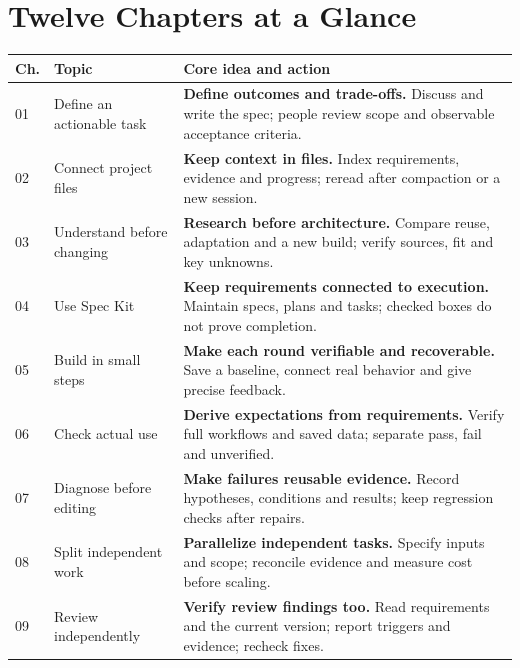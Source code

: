 \clearpage\section*{Twelve Chapters at a Glance}\label{summary}
\vspace{3mm}
\begingroup
\renewcommand{\arraystretch}{1.12}
\begin{tabularx}{\linewidth}{@{}L{8mm}L{43mm}Y@{}}
\toprule Ch. & Topic & Core idea and action\\\midrule
\textcolor{accent}{\textsf{01}} & Define an actionable task & \textbf{Define outcomes and trade-offs.} Discuss and write the spec; people review scope and observable acceptance criteria.\\[5pt]
\textcolor{accent}{\textsf{02}} & Connect project files & \textbf{Keep context in files.} Index requirements, evidence and progress; reread after compaction or a new session.\\[5pt]
\textcolor{accent}{\textsf{03}} & Understand before changing & \textbf{Research before architecture.} Compare reuse, adaptation and a new build; verify sources, fit and key unknowns.\\[5pt]
\textcolor{accent}{\textsf{04}} & Use Spec Kit & \textbf{Keep requirements connected to execution.} Maintain specs, plans and tasks; checked boxes do not prove completion.\\[5pt]
\textcolor{accent}{\textsf{05}} & Build in small steps & \textbf{Make each round verifiable and recoverable.} Save a baseline, connect real behavior and give precise feedback.\\[5pt]
\textcolor{accent}{\textsf{06}} & Check actual use & \textbf{Derive expectations from requirements.} Verify full workflows and saved data; separate pass, fail and unverified.\\[5pt]
\textcolor{accent}{\textsf{07}} & Diagnose before editing & \textbf{Make failures reusable evidence.} Record hypotheses, conditions and results; keep regression checks after repairs.\\[5pt]
\textcolor{accent}{\textsf{08}} & Split independent work & \textbf{Parallelize independent tasks.} Specify inputs and scope; reconcile evidence and measure cost before scaling.\\[5pt]
\textcolor{accent}{\textsf{09}} & Review independently & \textbf{Verify review findings too.} Read requirements and the current version; report triggers and evidence; recheck fixes.\\[5pt]

\end{tabularx}
